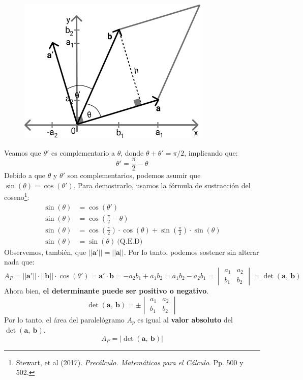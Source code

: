 \documentclass[12pt]{article}
\begin{document}
\newpage

\begin{figure}[hbt!]
\centering
\includegraphics[scale=0.6]{img/det-area-parallelog-2.jpg}
\end{figure}

Veamos que $\theta '$ es complementario a $\theta$, donde $\theta + \theta ' = \pi/2$, implicando que:
\[
  \theta ' = \frac{\pi}{2} - \theta
\]
Debido a que $\theta$ y $\theta '$ son complementarios, podemos asumir que $\sin(\theta) = \cos(\theta ')$. Para demostrarlo, usamos la fórmula de sustracción del coseno\footnote{Stewart, et al (2017). \textit{Precálculo. Matemáticas para el Cálculo}. Pp. 500 y 502.}:
\begin{align*}
\sin(\theta) &= \cos(\theta ') \\
\sin(\theta) &= \cos\left(\frac{\pi}{2} - \theta\right) \\
\sin(\theta) &= \cos\left(\frac{\pi}{2}\right) \cdot \cos(\theta) + \sin\left(\frac{\pi}{2}\right) \cdot \sin(\theta) \\
\sin(\theta) &= \sin(\theta) \ \text{(Q.E.D)}
\end{align*}
Observemos, también, que $||\mathbf{a}'|| = ||\mathbf{a}||$. Por lo tanto, podemos sostener sin alterar nada que:
\[
  A_{P} = ||\mathbf{a}'|| \cdot ||\mathbf{b}|| \cdot \cos(\theta ')
        = \mathbf{a}' \cdot \mathbf{b}
        = -a_{2}b_{1} + a_{1}b_{2}
        = a_{1}b_{2} - a_{2}b_{1}
        = \begin{vmatrix}
          a_{1} &  a_{2} \\
          b_{1} &  b_{2}
          \end{vmatrix}
        = \det(\mathbf{a}, \ \mathbf{b})
\]
Ahora bien, \textbf{el determinante puede ser positivo o negativo}.
\[
\det(\mathbf{a}, \ \mathbf{b}) =
\pm
\begin{vmatrix}
a_{1} &  a_{2} \\
b_{1} &  b_{2}
\end{vmatrix}
\]
Por lo tanto, el área del paralelógramo $A_{p}$ es igual al \textbf{valor absoluto} del $\det(\mathbf{a}, \ \mathbf{b})$.
\[
  A_{P} = |\det(\mathbf{a}, \ \mathbf{b})|
\]
\end{document}
